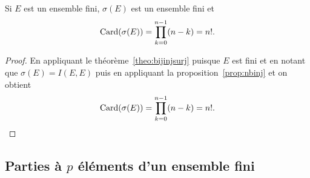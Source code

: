 \begin{prop}
  Si \(E\) est un ensemble fini, \(\sigma(E)\) est un ensemble fini et
  \begin{equation}
    \operatorname{Card}(\sigma(E))=\prod_{k=0}^{n-1}(n-k)=n!.
  \end{equation}
\end{prop}
\begin{proof}
  En appliquant le théorème~\ref{theo:bijinjsurj} puisque \(E\) est fini et en notant que \(\sigma(E)=I(E,E)\) puis en appliquant la proposition~\ref{prop:nbinj} et on obtient
  \begin{equation}
    \operatorname{Card}(\sigma(E))=\prod_{k=0}^{n-1}(n-k)=n!.
  \end{equation}
\end{proof}

\subsection{Parties à \(p\) éléments d'un ensemble fini}

